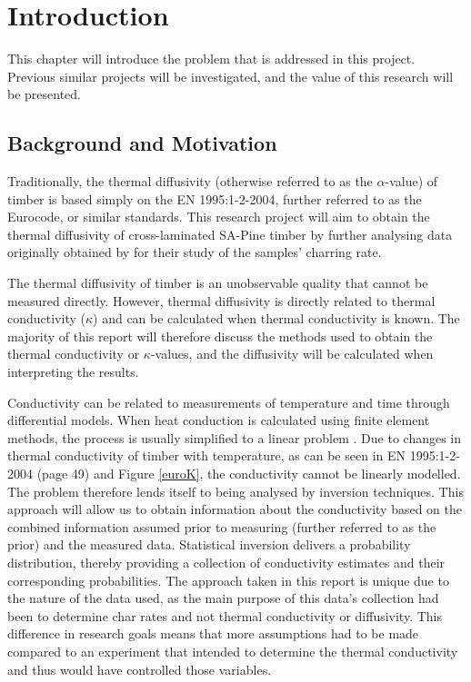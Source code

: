 \chapter{Introduction} \label{introduction}
This chapter will introduce the problem that is addressed in this project. 
Previous similar projects will be investigated, and the value of this research will be presented.

\section{Background and Motivation}

Traditionally, the thermal diffusivity (otherwise referred to as the $\alpha$-value) of timber is based simply on the EN 1995:1-2-2004\citep{Euro:2004}, further referred to as the Eurocode, or similar standards.
This research project will aim to obtain the thermal diffusivity of cross-laminated SA-Pine timber by further analysing data originally obtained by \citet{Westhuyzen:2020} for their study of the samples' charring rate.

The thermal diffusivity of timber is an unobservable quality that cannot be measured directly.
However, thermal diffusivity is directly related to thermal conductivity ($\kappa$) and can be calculated when thermal conductivity is known.
The majority of this report will therefore discuss the methods used to obtain the thermal conductivity or $\kappa$-values, and the diffusivity will be calculated when interpreting the results.

Conductivity can be related to measurements of temperature and time through differential models. 
When heat conduction is calculated using finite element methods, the process is usually simplified to a linear problem \citep{Fish:2007}. 
Due to changes in thermal conductivity of timber with temperature, as can be seen in EN 1995:1-2-2004 (page 49) and Figure \ref{euroK}, the conductivity cannot be linearly modelled.
The problem therefore lends itself to being analysed by inversion techniques. 
This approach will allow us to obtain information about the conductivity based on the combined information assumed prior to measuring (further referred to as the prior) and the measured data. 
Statistical inversion delivers a probability distribution, thereby providing a collection of conductivity estimates and their corresponding probabilities.
The approach taken in this report is unique due to the nature of the data used, as the main purpose of this data's collection had been to determine char rates and not thermal conductivity or diffusivity.
This difference in research goals means that more assumptions had to be made compared to an experiment that intended to determine the thermal conductivity and thus would have controlled those variables.

